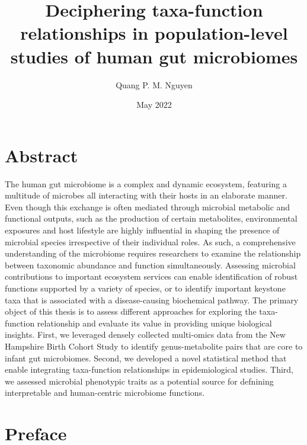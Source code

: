 \documentclass{dcthesis}
\title{Deciphering taxa-function relationships in population-level studies of human gut microbiomes}
\author{Quang P. M. Nguyen}
\date{May 2022}
\theoremstyle{definition}
\theoremstyle{remark}
\begin{document}
\frontmatter

\maketitle
\restoregeometry

\chapter*{Abstract}
The human gut microbiome is a complex and dynamic ecosystem, featuring a multitude of microbes all interacting with their hosts in an elaborate manner. Even though this exchange is often mediated through microbial metabolic and functional outputs, such as the production of certain metabolites, environmental exposures and host lifestyle are highly influential in shaping the presence of microbial species irrespective of their individual roles. As such, a comprehensive understanding of the microbiome requires researchers to examine the relationship between taxonomic abundance and function simultaneously. Assessing microbial contributions to important ecosystem services can enable identification of robust functions supported by a variety of species, or to identify important keystone taxa that is associated with a disease-causing biochemical pathway. The primary object of this thesis is to assess different approaches for exploring the taxa-function relationship and evaluate its value in providing unique biological insights. First, we leveraged densely collected multi-omics data from the New Hampshire Birth Cohort Study to identify genus-metabolite pairs that are core to infant gut microbiomes. Second, we developed a novel statistical method that enable integrating taxa-function relationships in epidemiological studies. Third, we assessed microbial phenotypic traits as a potential source for defnining interpretable and human-centric microbiome functions. 

\chapter*{Preface}
\end{document}
